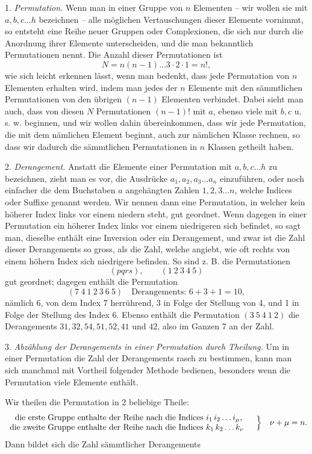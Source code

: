 \documentclass[10pt]{article}
\begin{document}
1. \emph{Permutation.} Wenn man in einer Gruppe von \(n\) Elementen -- wir wollen sie mit \(a,b,c\ldots h\) bezeichnen -- alle möglichen Vertauschungen dieser Elemente vornimmt, so entsteht eine Reihe neuer Gruppen oder Complexionen, die sich nur durch die Anordnung ihrer Elemente unterscheiden, und die man bekanntlich Permutationen nennt. Die Anzahl dieser Permutationen ist
\[
N=n(n-1)\ldots3\cdot2\cdot1=n!,
\]
wie sich leicht erkennen lässt, wenn man bedenkt, dass jede Permutation von \(n\) Elementen erhalten wird, indem man jedes der \(n\) Elemente mit den sämmtlichen Permutationen von den übrigen \((n-1)\) Elementen verbindet. Dabei sieht man auch, dass von diesen \(N\) Permutationen \((n-1)!\) mit \(a\), ebenso viele mit \(b,c\) u. s. w. beginnen, und wir wollen dahin übereinkommen, dass wir jede Permutation, die mit dem nämlichen Element beginnt, auch zur nämlichen Klasse rechnen, so dass wir dadurch die sämmtlichen Permutationen in \(n\) Klassen getheilt haben.

2. \emph{Derangement.} Anstatt die Elemente einer Permutation mit \(a,b,c\ldots h\) zu bezeichnen, zieht man es vor, die Ausdrücke \(a_1,a_2,a_3\ldots a_n\) einzuführen, oder noch einfacher die dem Buchstaben \(a\) angehängten Zahlen \(1,2,3\ldots n\), welche Indices oder Suffixe genannt werden. Wir nennen dann eine Permutation, in welcher kein höherer Index links vor einem niedern steht, gut geordnet. Wenn dagegen in einer Permutation ein höherer Index links vor einem niedrigeren sich befindet, so sagt man, dieselbe enthält eine Inversion oder ein Derangement, und zwar ist die Zahl dieser Derangements so gross, als die Zahl, welche angiebt, wie oft rechts von einem höhern Index sich niedrigere befinden. So sind z. B. die Permutationen
\[
(pqrs),\qquad (1\ 2\ 3\ 4\ 5)
\]
gut geordnet; dagegen enthält die Permutation
\[
(7\ 4\ 1\ 2\ 3\ 6\ 5)\quad\text{Derangements: }6+3+1=10,
\]
nämlich 6, von dem Index 7 herrührend, 3 in Folge der Stellung von 4, und 1 in Folge der Stellung des Index 6. Ebenso enthält die Permutation \((3\ 5\ 4\ 1\ 2)\) die Derangements \(31,32,54,51,52,41\) und \(42\), also im Ganzen 7 an der Zahl.

3. \emph{Abzählung der Derangements in einer Permutation durch Theilung.} Um in einer Permutation die Zahl der Derangements rasch zu bestimmen, kann man sich manchmal mit Vortheil folgender Methode bedienen, besonders wenn die Permutation viele Elemente enthält.

Wir theilen die Permutation in 2 beliebige Theile:
\[
\begin{array}{r@{\ }l}
\text{die erste Gruppe enthalte der Reihe nach die Indices} & i_1\,i_2\ldots i_\mu,\\
\text{die zweite Gruppe enthalte der Reihe nach die Indices} & k_1\,k_2\ldots k_\nu
\end{array}
\quad\Big\}\quad \nu+\mu=n.
\]
Dann bildet sich die Zahl sämmtlicher Derangements
\end{document}
